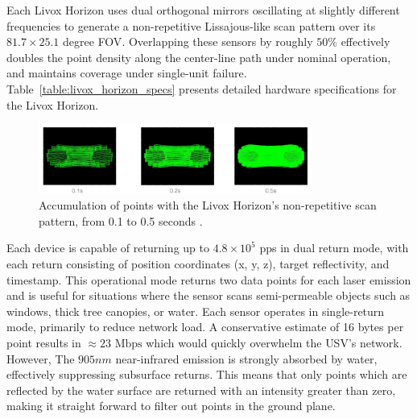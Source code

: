 \documentclass{erauthesis}
\begin{document}
Each Livox Horizon uses dual orthogonal mirrors oscillating at slightly different frequencies to generate a non-repetitive Lissajous-like scan pattern over its $81.7 \times 25.1$ degree \ac{FOV}. 
Overlapping these sensors by roughly $50 \%$ effectively doubles the point density along the center-line path under nominal operation, and maintains coverage under single-unit failure.
Table~\ref{table:livox_horizon_specs} presents detailed hardware specifications for the Livox Horizon.


\begin{figure}[htbp]
\centering
\includegraphics[width=0.8\textwidth]{Images/Livox_1.png}
\caption{Accumulation of points with the Livox Horizon's non-repetitive scan pattern, from 0.1 to 0.5 seconds  \cite{livox_manual}.}
\label{fig:livox_scan_pattern}
\end{figure}

Each device is capable of returning up to $4.8 \times 10^5$ \ac{pps} in dual return mode, with each return consisting of position coordinates (x, y, z), target reflectivity, and timestamp.
This operational mode returns two data points for each laser emission and is useful for situations where the sensor scans semi-permeable objects such as windows, thick tree canopies, or water.
Each sensor operates in single-return mode, primarily to reduce network load.
A conservative estimate of 16 bytes per point results in $\approx 23 \text{ Mbps}$ which would quickly overwhelm the \ac{USV}'s network.
However, The $905 nm$ near-infrared emission is strongly absorbed by water, effectively suppressing subsurface returns.
This means that only points which are reflected by the water surface are returned with an intensity greater than zero, making it straight forward to filter out points in the ground plane.
\end{document}
